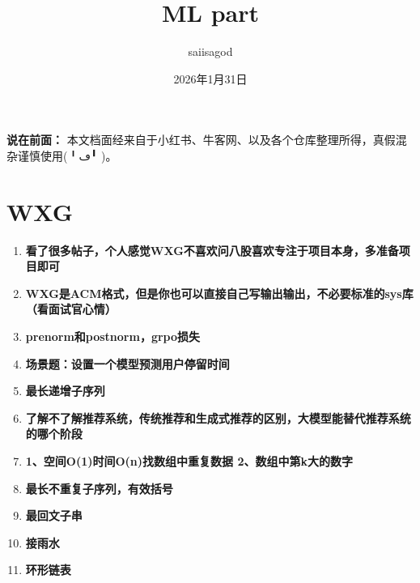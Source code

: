 \documentclass{article}
\title{ML part}
\author{saiisagod}
\date{2026年1月31日}
\begin{document}
\maketitle

\noindent\textbf{说在前面：}
本文档面经来自于小红书、牛客网、以及各个仓库整理所得，真假混杂谨慎使用(╹ڡ╹ )。

\section{WXG}
\begin{enumerate}
\item \textbf{看了很多帖子，个人感觉WXG不喜欢问八股喜欢专注于项目本身，多准备项目即可}\\
\item \textbf{WXG是ACM格式，但是你也可以直接自己写输出输出，不必要标准的sys库（看面试官心情）}
\item \textbf{prenorm和postnorm，grpo损失}\\
\item \textbf{场景题：设置一个模型预测用户停留时间}\\
\item \textbf{最长递增子序列}\\
\item \textbf{了解不了解推荐系统，传统推荐和生成式推荐的区别，大模型能替代推荐系统的哪个阶段}\\
\item \textbf{1、空间O(1)时间O(n)找数组中重复数据 2、数组中第k大的数字}\\
\item \textbf{最长不重复子序列，有效括号}\\
\item \textbf{最回文子串}\\
\item \textbf{接雨水}\\
\item \textbf{环形链表}\\
\end{enumerate}
\end{document}

